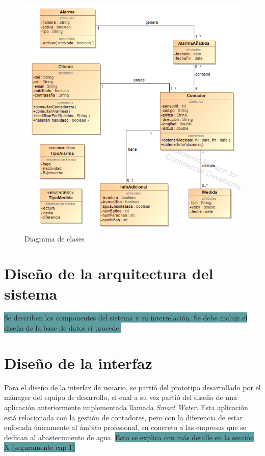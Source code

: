 \documentclass[pdftex,11pt,a4paper]{book}
\begin{document}
 \begin{figure}[H]
 \centering
 \includegraphics [scale=0.90] {images/diagramas/diagrama-clases.png}
 \caption{Diagrama de clases} \label{fig:diagrama-clases}
 \end{figure}


\section{Diseño de la arquitectura del sistema}

\colorbox{CadetBlue}{ Se describen los componentes del sistema y su interrelación. Se debe incluir el diseño de la base de datos si procede.}

\section{Diseño de la interfaz}

Para el diseño de la interfaz de usuario, se partió del prototipo desarrollado por el mánager del equipo de desarrollo, el cual a su vez partió del diseño de una aplicación anteriormente implementada llamada \textit{Smart Water}. Esta aplicación está relacionada con la gestión de contadores, pero con la diferencia de estar enfocada únicamente al ámbito profesional, en concreto a las empresas que se dedican al abastecimiento de agua. \colorbox{CadetBlue}{Esto se explica con más detalle en la sección X (seguramente cap 1)}
\end{document}
